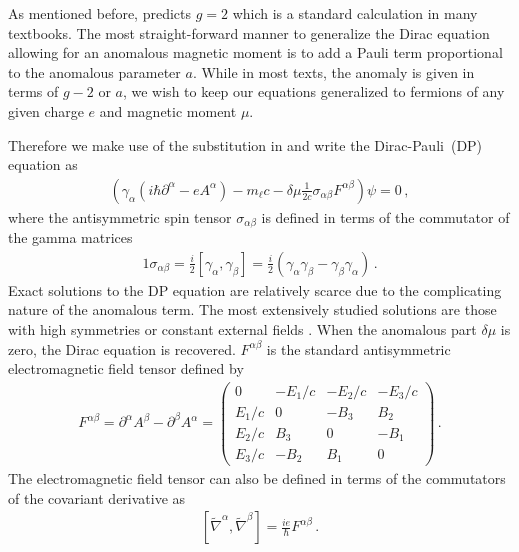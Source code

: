 As mentioned before,  predicts $g\!=\!2$ which is a standard calculation in many textbooks. The most straight-forward manner to generalize the Dirac equation allowing for an anomalous magnetic moment is to add a Pauli term proportional to the anomalous parameter $a$. While in most texts, the anomaly is given in terms of $g-2$ or $a$, we wish to keep our equations generalized to fermions of any given charge $e$ and magnetic moment $\mu$. 

Therefore we make use of the substitution in  and write the Dirac-Pauli~(DP) equation as
\begin{gather}
	\label{dp:1}
    \left(\gamma_{\alpha}\left(i\hbar\partial^{\alpha} - eA^{\alpha}\right) - m_{\ell}c - \delta\mu\frac{1}{2c}\sigma_{\alpha\beta}F^{\alpha\beta}\right)\psi=0\,,
\end{gather}
where the antisymmetric spin tensor $\sigma_{\alpha\beta}$ is defined in terms of the commutator of the gamma matrices
\begin{alignat}{1}
	\label{sigma:1} \sigma_{\alpha\beta}=\frac{i}{2}\left[\gamma_{\alpha},\gamma_{\beta}\right]=\frac{i}{2}\left(\gamma_{\alpha}\gamma_{\beta}-\gamma_{\beta}\gamma_{\alpha}\right)\,.
\end{alignat}
Exact solutions to the DP equation are relatively scarce due to the complicating nature of the anomalous term. The most extensively studied solutions are those with high symmetries or constant external fields \citep{Thaller:1992ji}. When the anomalous part $\delta\mu$ is zero, the Dirac equation is recovered. $F^{\alpha\beta}$ is the standard antisymmetric electromagnetic field tensor defined by
\begin{gather}
    \label{em:1}
    F^{\alpha\beta} = \partial^{\alpha}A^{\beta} - \partial^{\beta}A^{\alpha} = 
    \begin{pmatrix}
        0        & -E_{1}/c  & -E_{2}/c  & -E_{3}/c\\
        E_{1}/c  & 0         & -B_{3}    & B_{2}\\
        E_{2}/c  & B_{3}     & 0         & -B_{1}\\
        E_{3}/c  & -B_{2}    & B_{1}     & 0
    \end{pmatrix}\,.
\end{gather}
The electromagnetic field tensor can also be defined in terms of the commutators of the covariant derivative  as
\begin{align}
    \left[\widetilde\nabla^{\alpha},\widetilde\nabla^{\beta}\right]=\frac{ie}{\hbar}F^{\alpha\beta}\,.
\end{align}
